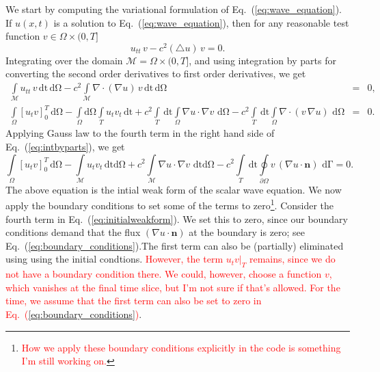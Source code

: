 \documentclass[nofootinbib,preprintnumbers,superscriptaddress,notitlepage]{revtex4-1}
\newcommand{\<}{\begin{equation}}
\newcommand{\?}{\end{equation}}
\begin{document}
We start by computing the variational formulation of
Eq.~(\ref{eq:wave_equation}). If $u(x,t)$ is a solution to
Eq.~(\ref{eq:wave_equation}), then for any reasonable test function $v \in
\Omega \times (0, T]$
\begin{equation}
u_{tt}\,v - c^2 (\bigtriangleup u)\, v = 0.
\end{equation}
Integrating over the domain $\mathcal{M} = \Omega \times (0, T]$, and using
integration by parts for converting the second order derivatives to first
order derivatives, we get
\begin{eqnarray}
\int\limits_{\mathcal{M}} u_{tt}\,v \mathrm{\,dt\, d\Omega} 
- c^2 \int\limits_{\mathcal{M}} \nabla\cdot(\nabla u)\, v \mathrm{\,dt\, d\Omega} 
&=& 0,\\
\label{eq:intbyparts}
\int\limits_{\Omega}\left[u_t v \right]_{0}^{T}\,\mathrm{d\Omega}  
- \int\limits_{\Omega}\mathrm{d\Omega}\int\limits_{T} u_t v_t \mathrm{\,dt}
+ c^2\int\limits_{T}\,\mathrm{dt}\int\limits_{\Omega} \nabla u \cdot \nabla v \,\mathrm{\,d\Omega}
- c^2\int\limits_{T}\,\mathrm{dt}\int\limits_{\Omega} \nabla \cdot \left(v\,\nabla u\right) \,\mathrm{\,d\Omega}
&=& 0.
\end{eqnarray}
Applying Gauss law to the fourth term in the right hand side of Eq.~(\ref{eq:intbyparts}), we get
\begin{equation}
\label{eq:initialweakform}
\int\limits_{\Omega}\left[u_t v \right]_{0}^{T}\,\mathrm{d\Omega}  
- \int\limits_{\mathcal{M}} u_t v_t \mathrm{\,dtd\Omega}
+ c^2\int\limits_{\mathcal{M}} \nabla u \cdot \nabla v \,\mathrm{\,dt d\Omega}
- c^2\int\limits_{T}\,\mathrm{dt}\oint\limits_{\partial\Omega} v\, \left(\nabla u \cdot \mathbf{n}\right) \,\mathrm{\,d\Gamma}
= 0.
\end{equation}
The above equation is the intial weak form of the scalar wave equation. We now
apply the boundary conditions to set some of the terms to
zero\footnote{\textcolor{red}{How we apply these boundary conditions
explicitly in the code is something I'm still working on.}}. Consider the
fourth term in Eq.~(\ref{eq:initialweakform}). We set this to zero, since our
boundary conditions demand that the flux $(\nabla u \cdot \mathbf{n})$ at the
boundary is zero; see Eq.~(\ref{eq:boundary_conditions}).The first term can
also be (partially) eliminated using using the initial condtions.
\textcolor{red}{However, the term $u_t v |_{T}$ remains, since we do not have
a boundary condition there. We could, however, choose a function $v$, which
vanishes at the final time slice, but I'm not sure if that's allowed. For the
time, we assume that the first term can also be set to zero in
Eq.~(\ref{eq:boundary_conditions})}.\\
\end{document}
